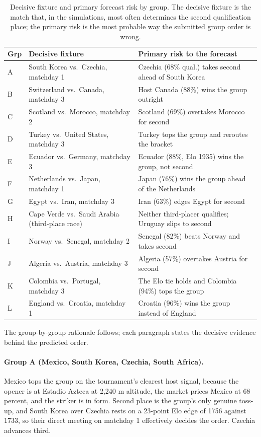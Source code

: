 \documentclass[11pt,a4paper]{article}
\begin{document}
\begin{table}[ht]
\centering\small
\caption{Decisive fixture and primary forecast risk by group. The decisive fixture is the match that, in the simulations, most often determines the second qualification place; the primary risk is the most probable way the submitted group order is wrong.}
\label{tab:watchrisk}
\begin{tabular}{p{0.5cm}p{5.4cm}p{6.6cm}}
\toprule
Grp & Decisive fixture & Primary risk to the forecast \\
\midrule
A & South Korea vs.\ Czechia, matchday 1 & Czechia (68\% qual.) takes second ahead of South Korea \\
B & Switzerland vs.\ Canada, matchday 3 & Host Canada (88\%) wins the group outright \\
C & Scotland vs.\ Morocco, matchday 2 & Scotland (69\%) overtakes Morocco for second \\
D & Turkey vs.\ United States, matchday 3 & Turkey tops the group and reroutes the bracket \\
E & Ecuador vs.\ Germany, matchday 3 & Ecuador (88\%, Elo 1935) wins the group, not second \\
F & Netherlands vs.\ Japan, matchday 1 & Japan (76\%) wins the group ahead of the Netherlands \\
G & Egypt vs.\ Iran, matchday 3 & Iran (63\%) edges Egypt for second \\
H & Cape Verde vs.\ Saudi Arabia (third-place race) & Neither third-placer qualifies; Uruguay slips to second \\
I & Norway vs.\ Senegal, matchday 2 & Senegal (82\%) beats Norway and takes second \\
J & Algeria vs.\ Austria, matchday 3 & Algeria (57\%) overtakes Austria for second \\
K & Colombia vs.\ Portugal, matchday 3 & The Elo tie holds and Colombia (94\%) tops the group \\
L & England vs.\ Croatia, matchday 1 & Croatia (96\%) wins the group instead of England \\
\bottomrule
\end{tabular}
\end{table}

The group-by-group rationale follows; each paragraph states the decisive evidence behind the predicted order.

\paragraph{Group A (Mexico, South Korea, Czechia, South Africa).} Mexico tops the group on the tournament's clearest host signal, because the opener is at Estadio Azteca at 2{,}240 m altitude, the market prices Mexico at 68 percent, and the striker is in form. Second place is the group's only genuine toss-up, and South Korea over Czechia rests on a 23-point Elo edge of 1756 against 1733, so their direct meeting on matchday 1 effectively decides the order. Czechia advances third.
\end{document}
